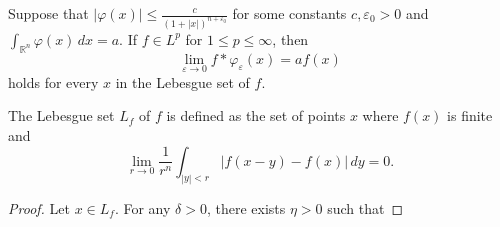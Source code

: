 \begin{theorem}
    Suppose that $|\varphi(x)| \leq \frac{c}{(1+|x|)^{n+\varepsilon_0}}$ for some constants $c, \varepsilon_0 > 0$ and $\int_{\mathbb{R}^n} \varphi(x) \, dx = a$. If $f \in L^p$ for $1 \leq p \leq \infty$, then
$$\lim_{\varepsilon \rightarrow 0} f * \varphi_{\varepsilon}(x) = a f(x)$$
holds for every $x$ in the Lebesgue set of $f$.


\end{theorem}
\begin{rmk}
    The Lebesgue set $L_f$ of $f$ is defined as the set of points $x$ where $f(x)$ is finite and
$$\lim_{r \rightarrow 0} \frac{1}{r^n} \int_{|y| < r} |f(x-y) - f(x)| \, dy = 0.$$
\end{rmk}
\begin{proof}
    Let $x \in L_f$. For any $\delta > 0$, there exists $\eta > 0$ such that


\end{proof}
